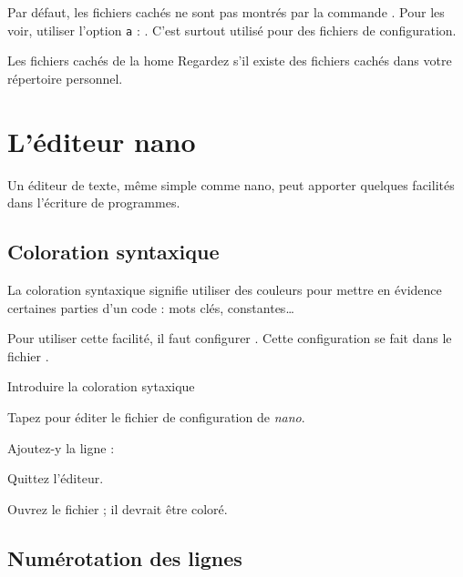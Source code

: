 \documentclass[a4paper,11pt]{style-esi/td}
\begin{document}
		Par défaut, 
		les fichiers cachés ne sont pas montrés par la commande .
		Pour les voir, utiliser l'option \texttt{a} : .
		C'est surtout utilisé pour des fichiers de configuration.

		\begin{Exercice}{Les fichiers cachés de la home}
			Regardez s'il existe des fichiers cachés
			dans votre répertoire personnel.
		\end{Exercice}

\section{L'éditeur nano}

	Un éditeur de texte, même simple comme nano,
	peut apporter quelques facilités dans l'écriture de programmes.

	\subsection{Coloration syntaxique}

		La coloration syntaxique signifie 
		utiliser des couleurs pour mettre en évidence certaines parties d'un code :
		mots clés, constantes\dots{}
	
		Pour utiliser cette facilité, 
		il faut configurer . 
		Cette configuration se fait dans le fichier .

		\begin{Tutoriel}{Introduire la coloration sytaxique} 
			\vspace{-1em}
			\begin{steps}
			\item 
				Tapez  
				pour éditer le fichier de configuration de \emph{nano}.
			\item 
				Ajoutez-y la ligne : 
			\item 
				Quittez l'éditeur.
			\item 
				Ouvrez le fichier ;
				il devrait être coloré.
			\end{steps}
		\end{Tutoriel}
				
	\subsection{Numérotation des lignes}
				
\end{document}
